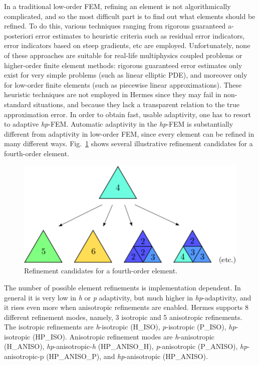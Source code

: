 In a traditional low-order FEM, refining an element is not algorithmically complicated,
and so the most difficult part is to find out what elements should be refined. 
To do this, various techniques ranging from rigorous guaranteed a-posteriori 
error estimates to heuristic criteria such as residual error indicators, 
error indicators based on steep gradients, etc are employed. 
Unfortunately, none of these approaches are suitable for real-life 
multiphysics coupled problems or higher-order finite element methods: 
rigorous guaranteed error estimates only exist for very simple problems 
(such as linear elliptic PDE), and moreover only for low-order finite elements 
(such as piecewise linear approximations). These heuristic techniques 
are not employed in Hermes since they may fail 
in non-standard situations, and because they lack a 
transparent relation to the true approximation error.
In order to obtain fast, usable adaptivity, one has to resort to adaptive \emph{hp}-FEM.
Automatic adaptivity in the \emph{hp}-FEM is substantially different from adaptivity 
in low-order FEM, since every element can be refined in many different ways. 
Fig.~\ref{fig:refinements} shows several illustrative refinement candidates for a fourth-order element.
\begin{figure}
  \begin{centering}
  \includegraphics[width=0.5\columnwidth]{refinements}
  \caption{\label{fig:refinements} Refinement candidates for a fourth-order
  element.}
  \end{centering}
\end{figure}
The number of possible element refinements is implementation dependent. 
In general it is very low in \emph{h} or \emph{p} adaptivity, 
but much higher in \emph{hp}-adaptivity, and it rises even more when 
anisotropic refinements are enabled.
Hermes supports 8 different refinement modes, namely,
3 isotropic and 5 anisotropic refinements. The isotropic refinements are
\emph{h}-isotropic (H\_ISO), \emph{p}-isotropic (P\_ISO), \emph{hp}-isotropic (HP\_ISO).
Anisotropic refinement modes are
\emph{h}-anisotropic (H\_ANISO),
\emph{hp}-anisotropic-\emph{h} (HP\_ANISO\_H), \emph{p}-anisotropic (P\_ANISO),
\emph{hp}-anisotropic-p (HP\_ANISO\_P), and \emph{hp}-anisotropic (HP\_ANISO).
